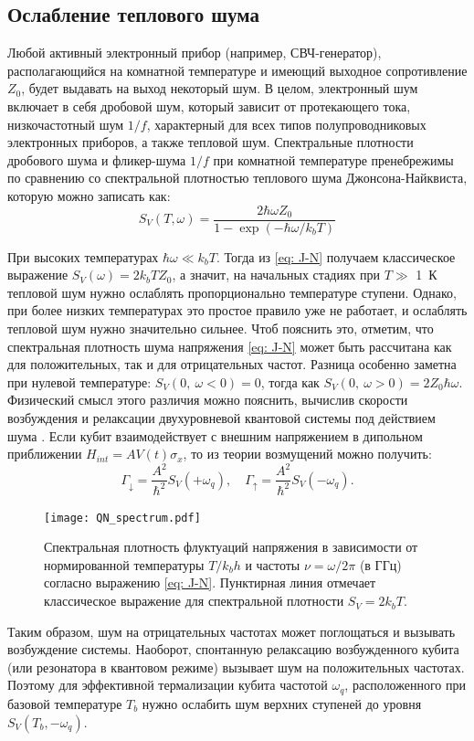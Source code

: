\subsection{Ослабление теплового шума}
Любой активный электронный прибор (например, СВЧ-генератор), располагающийся на комнатной температуре и имеющий выходное сопротивление $Z_0$, будет выдавать на выход некоторый шум. В целом, электронный шум включает в себя дробовой шум, который зависит от протекающего тока, низкочастотный шум $1/f$, характерный для всех типов полупроводниковых электронных приборов, а также тепловой шум. Спектральные плотности дробового шума и фликер-шума $1/f$ при комнатной температуре пренебрежимы по сравнению со спектральной плотностью теплового шума Джонсона-Найквиста, которую можно записать как:
\begin{equation}
S_V(T, \omega) =\frac{2\hbar \omega Z_0}{1-\exp\left(-\hbar\omega/k_bT\right)}
\label{eq: J-N}
\end{equation}

При высоких температурах $\hbar \omega \ll k_b T $. Тогда из \eqref{eq: J-N} получаем классическое выражение $S_V(\omega) = 2k_bTZ_0$, а значит, на начальных стадиях при $T \gg $ 1~К тепловой шум нужно ослаблять пропорционально температуре ступени. Однако, при более низких температурах это простое правило уже не работает, и ослаблять тепловой шум нужно значительно сильнее. Чтоб пояснить это, отметим, что спектральная плотность шума напряжения \eqref{eq: J-N} может быть рассчитана как для положительных, так и для отрицательных частот. Разница особенно заметна при нулевой температуре: $S_V(0,\ {\omega\! <\! 0})=0$, тогда как $S_V(0,\ {\omega\! >\! 0})=2Z_0 \hbar\omega$. Физический смысл этого различия можно пояснить, вычислив скорости возбуждения и релаксации двухуровневой квантовой системы под действием шума \cite{schoelkopf2003qubits}. Если кубит взаимодействует с внешним напряжением в дипольном приближении $H_{int} = A V(t) \sigma_x$, то из теории возмущений можно получить:
\begin{equation}
\Gamma_\downarrow = \frac{A^2}{\hbar^2}S_V(+\omega_q), \quad \Gamma_\uparrow = \frac{A^2}{\hbar^2}S_V(-\omega_q).
\end{equation}
\begin{figure}[h]\centering
	\texttt{[image: QN\_spectrum.pdf]} \hfill
	\caption[Спектральная плотность флуктуаций напряжения]{Спектральная плотность флуктуаций напряжения в зависимости от нормированной температуры $T/k_b h$ и частоты $\nu=\omega/2\pi$ (в ГГц) согласно выражению \eqref{eq: J-N}. Пунктирная линия отмечает классическое выражение для спектральной плотности $S_V = 2 k_b T$. }
	\label{img: S_V}
\end{figure}
Таким образом, шум на отрицательных частотах может поглощаться и вызывать возбуждение системы. Наоборот, спонтанную релаксацию возбужденного кубита (или резонатора в квантовом режиме) вызывает шум на положительных частотах. Поэтому для эффективной термализации кубита частотой $\omega_q$, расположенного при базовой температуре $T_b$ нужно ослабить шум верхних ступеней до уровня $S_V(T_b, -\omega_q)$. 

